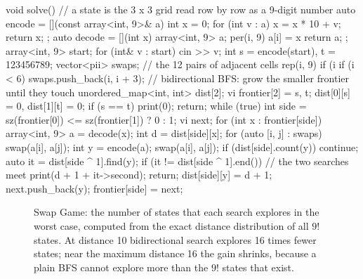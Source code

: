 \begin{code}
void solve() {
    // a state is the 3 x 3 grid read row by row as a 9-digit number
    auto encode = [](const array<int, 9>& a) {
        int x = 0;
        for (int v : a) x = x * 10 + v;
        return x;
    };
    auto decode = [](int x) {
        array<int, 9> a;
        per(i, 9) a[i] = x %
        return a;
    };
    array<int, 9> start;
    for (int& v : start) cin >> v;
    int s = encode(start), t = 123456789;
    vector<pii> swaps;  // the 12 pairs of adjacent cells
    rep(i, 9) {
        if (i %
        if (i < 6) swaps.push_back({i, i + 3});
    }
    // bidirectional BFS: grow the smaller frontier until they touch
    unordered_map<int, int> dist[2];
    vi frontier[2] = {{s}, {t}};
    dist[0][s] = 0, dist[1][t] = 0;
    if (s == t) {
        print(0);
        return;
    }
    while (true) {
        int side = sz(frontier[0]) <= sz(frontier[1]) ? 0 : 1;
        vi next;
        for (int x : frontier[side]) {
            array<int, 9> a = decode(x);
            int d = dist[side][x];
            for (auto [i, j] : swaps) {
                swap(a[i], a[j]);
                int y = encode(a);
                swap(a[i], a[j]);
                if (dist[side].count(y)) continue;
                auto it = dist[side ^ 1].find(y);
                if (it != dist[side ^ 1].end()) {  // the two searches meet
                    print(d + 1 + it->second);
                    return;
                }
                dist[side][y] = d + 1;
                next.push_back(y);
            }
        }
        frontier[side] = next;
    }
}
\end{code}

\begin{figure}[htbp]
\centering
{}
\caption{Swap Game: the number of states that each search explores in the worst case, computed from the exact distance
distribution of all $9!$ states. At distance 10 bidirectional search explores 16 times fewer states; near the maximum distance
16 the gain shrinks, because a plain BFS cannot explore more than the $9!$ states that exist.}
\label{fig:swapstates}
\end{figure}

